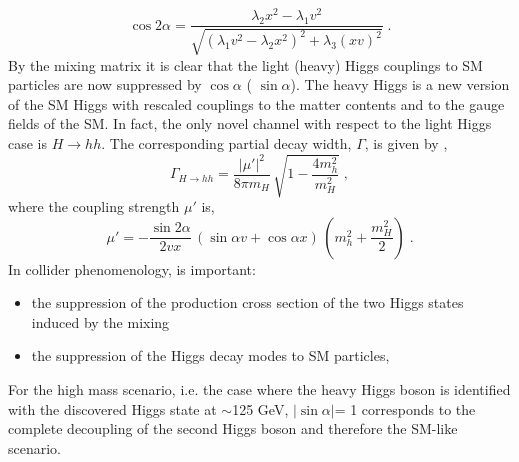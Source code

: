 \begin{equation}
\cos 2 \alpha= \frac{\lambda_2 x^2 - \lambda_1 v^2}{\sqrt{(\lambda_1 v^2 - \lambda_2 x^2)^2 +\lambda_3 (xv)^2 } } \; .  \end{equation}
\newline
\newline
By the  mixing matrix it is clear that the light (heavy) Higgs couplings to SM particles are now
suppressed by $\cos \alpha $ ( $\sin \alpha $).
The heavy Higgs is a new version of the SM Higgs with rescaled couplings
to the matter contents and to the gauge fields of the SM. In fact, the only novel channel
with respect to the light Higgs case is $H \rightarrow hh$. The corresponding  partial decay width, $\Gamma$, is given by \cite{Schabinger:2005ei},
\newline
\newline
 \begin{equation}
\Gamma_{ H \rightarrow hh} =  \frac{|\mu'|^2}{8 \pi m_H } \, \sqrt{1- \frac{4m_h^2}{m_H^2}}  \; , \end{equation}
\newline
where the coupling strength $\mu'$ is,
\newline
\begin{equation}
 \mu' =  - \frac{\sin 2 \alpha}{2vx} \, (\sin \alpha v + \cos \alpha x) \, (m_h^2 + \frac{m_H^2}{2})  \; . \end{equation}
\newline
In collider phenomenology, is important:
\begin{itemize}
\item the suppression of the production cross section of the two Higgs states induced by the mixing
\item the suppression of the Higgs decay modes to SM particles,
\end{itemize}
For the high mass  scenario, i.e. the case where the heavy Higgs boson is identified with the discovered Higgs state at $\sim$125 GeV, $|\sin \alpha| $= 1 corresponds to the complete decoupling of the second Higgs boson and therefore the SM-like scenario.


